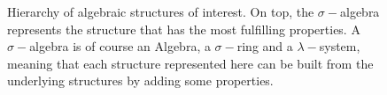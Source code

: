 \begin{figure}
    \caption{Hierarchy of algebraic structures of interest. On top, the $\sigma-$algebra represents the structure that has the most fulfilling properties. A $\sigma-$algebra is of course an Algebra, a $\sigma-$ring and a $\lambda-$system, meaning that each structure represented here can be built from the underlying structures by adding some properties.}
    \label{fig:hierarchy}
\end{figure}
